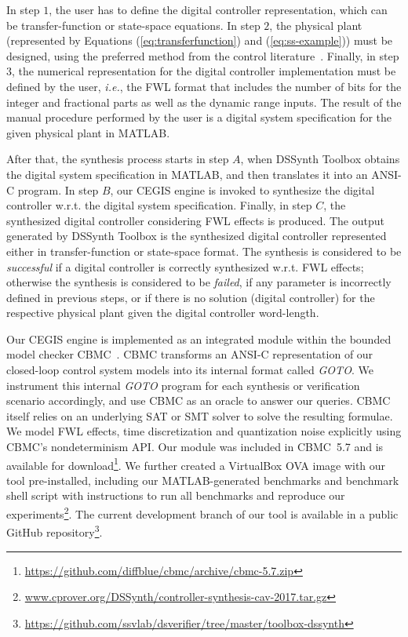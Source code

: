 \documentclass[10pt,conference]{IEEEtran}
\newcommand\tool{{DSSynth Toolbox}\xspace}
\begin{document}
In step $1$, the user has to define the digital controller representation, 
which can be transfer-function or state-space equations. 
In step $2$, the physical plant (represented by Equations (\ref{eq:transferfunction}) 
and (\ref{eq:ss-example})) must be designed, using the preferred method 
from the control literature~\cite{astrom1997computer}. Finally, in step $3$, 
the numerical representation for the digital controller implementation must be 
defined by the user, {\it i.e.}, the FWL format that includes the number of bits for the integer 
and fractional parts as well as the dynamic range inputs. The result of the manual 
procedure performed by the user is a digital system specification for the given 
physical plant in MATLAB. 

After that, the synthesis process starts in step $A$, when \tool obtains the digital system 
specification in MATLAB, and then translates it into an ANSI-C program. 
In step $B$, our CEGIS engine is invoked to synthesize the digital controller w.r.t. the digital system
specification. Finally, in step $C$, the synthesized digital controller considering FWL effects is produced. 
The output generated by \tool is the synthesized digital controller represented either in transfer-function 
or state-space format. The synthesis is considered to be \emph{successful} if a digital controller is correctly 
synthesized w.r.t. FWL effects; otherwise the synthesis is considered to be \emph{failed}, if any parameter is 
incorrectly defined in previous steps, or if there is no solution (digital controller) for the respective physical plant
 given the digital controller word-length.

Our CEGIS engine is implemented as an integrated module within the bounded model checker CBMC~\cite{cbmc}.  CBMC
transforms an ANSI-C representation of our closed-loop control system models into its internal format called
\emph{GOTO}.  We instrument this internal \emph{GOTO} program for each synthesis or verification scenario accordingly,
and use CBMC as an oracle to answer our queries.  CBMC itself relies on an underlying SAT or SMT solver to solve the
resulting formulae.  We model FWL effects, time discretization and quantization noise explicitly using CBMC's
nondeterminism API.  Our module was included in CBMC~5.7 and is available for
download\footnote{\url{https://github.com/diffblue/cbmc/archive/cbmc-5.7.zip}}.  We further created a VirtualBox OVA image
with our tool pre-installed, including our MATLAB-generated benchmarks and benchmark shell script with instructions
to run all benchmarks and reproduce our
experiments\footnote{\url{www.cprover.org/DSSynth/controller-synthesis-cav-2017.tar.gz}}.  The current development branch
of our tool is available in a public GitHub
repository\footnote{\url{https://github.com/ssvlab/dsverifier/tree/master/toolbox-dssynth}}.
\end{document}

